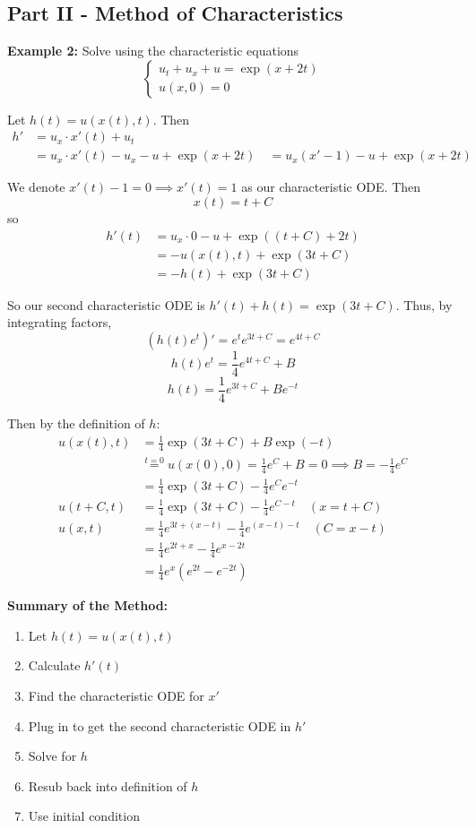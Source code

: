 \documentclass[12pt]{article}
\begin{document}
\subsection*{Part II - Method of Characteristics}
\textbf{Example 2:} Solve using the characteristic equations 
\[\begin{cases}
    u_t + u_x + u = \exp(x + 2t)\\
    u(x, 0) = 0
\end{cases}\]

Let $h(t) = u(x(t), t)$. Then 
\begin{align*}
    h' &= u_x \cdot x'(t) + u_t\\
    &=  u_x \cdot x'(t) -u_x - u + \exp(x + 2t)\
    &= u_x(x' - 1) - u + \exp(x + 2t)
\end{align*}

We denote $x'(t) - 1 = 0 \implies x'(t) = 1$ as our characteristic ODE. Then 
\[x(t) = t + C\]
so 
\begin{align*}
    h'(t) &= u_x\cdot 0 - u + \exp((t + C) + 2t)\\
    &= -u(x(t), t) + \exp(3t + C)\\
    &= -h(t) + \exp(3t + C)
\end{align*}

So our second characteristic ODE is $h'(t) + h(t) = \exp(3t + C)$. Thus, by integrating factors,
\[(h(t)e^t)' = e^t e^{3t+C} = e^{4t + C}\]
\[h(t)e^t = \frac{1}{4}e^{4t+C} +B \]
\[h(t) = \frac{1}{4}e^{3t+C} + Be^{-t}\]

Then by the definition of $h$:
\begin{align*}
    u(x(t), t) &= \frac{1}{4}\exp(3t  +C) + B\exp(-t)\\
    &\overset{t=0}{=} u(x(0), 0) = \frac{1}{4}e^{C} + B = 0\implies B = -\frac{1}{4}e^C\\
    &= \frac{1}{4}\exp(3t  +C) -\frac{1}{4}e^Ce^{-t}\\
    u(t + C, t) &= \frac{1}{4}\exp(3t  +C) -\frac{1}{4}e^{C-t} \quad (x = t +C)\\
    u(x, t) &= \frac{1}{4}e^{3t + (x-t)} -\frac{1}{4}e^{(x-t) - t}\quad (C = x - t)\\
    &= \frac{1}{4}e^{2t + x} - \frac{1}{4}e^{x - 2t}\\
    &= \boxed{\frac{1}{4}e^x(e^{2t} - e^{-2t})}
\end{align*}

\textbf{Summary of the Method:}
\begin{enumerate}
    \item Let $h(t) = u(x(t), t)$
    \item Calculate $h'(t)$
    \item Find the characteristic ODE for $x'$
    \item Plug in to get the second characteristic ODE in $h'$
    \item Solve for $h$
    \item Resub back into definition of $h$
    \item Use initial condition
\end{enumerate}
\end{document}
